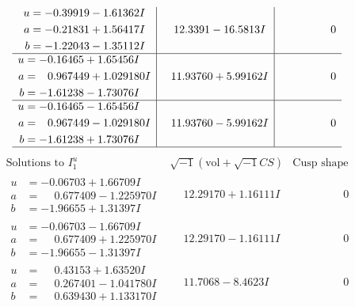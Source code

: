\documentclass[1p]{elsarticle_modified}
\theoremstyle{definition}
\newcommand{\I}{\sqrt{-1}}
\begin{document}
$$\begin{array}{c|c|c}
\begin{aligned}
u &= -0.39919 - 1.61362 I \\
a &= -0.21831 + 1.56417 I \\
b &= -1.22043 - 1.35112 I\end{aligned}
 & \phantom{-}12.3391 - 16.5813 I & \phantom{-0.000000 } 0 \\ \hline\begin{aligned}
u &= -0.16465 + 1.65456 I \\
a &= \phantom{-}0.967449 + 1.029180 I \\
b &= -1.61238 - 1.73076 I\end{aligned}
 & \phantom{-}11.93760 + 5.99162 I & \phantom{-0.000000 } 0 \\ \hline\begin{aligned}
u &= -0.16465 - 1.65456 I \\
a &= \phantom{-}0.967449 - 1.029180 I \\
b &= -1.61238 + 1.73076 I\end{aligned}
 & \phantom{-}11.93760 - 5.99162 I & \phantom{-0.000000 } 0\\
 \hline 
 \end{array}$$\newpage$$\begin{array}{c|c|c}  
\text{Solutions to }I^u_{1}& \I (\text{vol} + \sqrt{-1}CS) & \text{Cusp shape}\\
 \hline 
\begin{aligned}
u &= -0.06703 + 1.66709 I \\
a &= \phantom{-}0.677409 - 1.225970 I \\
b &= -1.96655 + 1.31397 I\end{aligned}
 & \phantom{-}12.29170 + 1.16111 I & \phantom{-0.000000 } 0 \\ \hline\begin{aligned}
u &= -0.06703 - 1.66709 I \\
a &= \phantom{-}0.677409 + 1.225970 I \\
b &= -1.96655 - 1.31397 I\end{aligned}
 & \phantom{-}12.29170 - 1.16111 I & \phantom{-0.000000 } 0 \\ \hline\begin{aligned}
u &= \phantom{-}0.43153 + 1.63520 I \\
a &= \phantom{-}0.267401 - 1.041780 I \\
b &= \phantom{-}0.639430 + 1.133170 I\end{aligned}
 & \phantom{-}11.7068 - 8.4623 I & \phantom{-0.000000 } 0 \\ \hline\begin{aligned}

\end{aligned}
\end{array}$$
\end{document}
